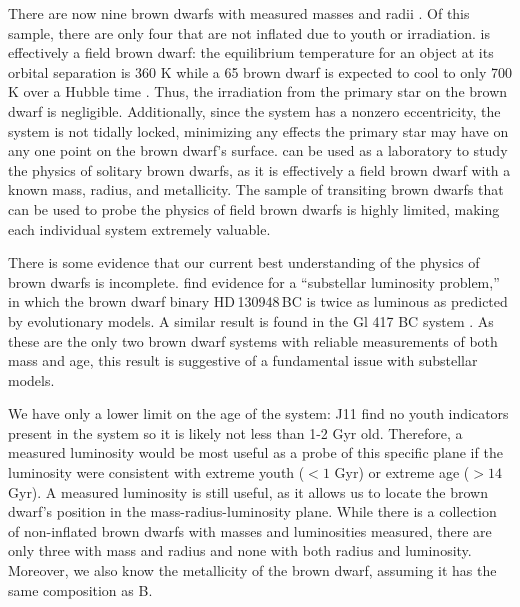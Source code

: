 There are now nine brown dwarfs with measured masses and radii \citep{Moutou13}. 
Of this sample, there are only four that are not inflated due to youth or irradiation.
\LC{} is effectively a field brown dwarf: the equilibrium temperature for an object at its orbital separation is 360 K while a 65 \mjup{} brown dwarf is expected to cool to only 700 K over a Hubble time \citep{Burrows01}.
Thus, the irradiation from the primary star on the brown dwarf is negligible.
Additionally, since the system has a nonzero eccentricity, the system is not tidally locked, minimizing any effects the primary star may have on any one point on the brown dwarf's surface.
\LC{} can be used as a laboratory to study the physics of solitary brown dwarfs, as it is effectively a field brown dwarf with a known mass, radius, and metallicity.
The sample of transiting brown dwarfs that can be used to probe the physics of field brown dwarfs is highly limited, making each individual system extremely valuable.

There is some evidence that our current best understanding of the physics of brown dwarfs is incomplete.
\citet{Dupuy09} find evidence for a ``substellar luminosity problem,'' in which the brown dwarf binary HD\,130948\,BC is twice as luminous as predicted by evolutionary models.
A similar result is found in the Gl 417 BC system \citep{Dupuy14}.
As these are the only two brown dwarf systems with reliable measurements of both mass and age, this result is suggestive of a fundamental issue with substellar models.

We have only a lower limit on the age of the system: J11 find no youth indicators present in the \LHS{} system so it is likely not less than 1-2 Gyr old.
Therefore, a measured luminosity would be most useful as a probe of this specific plane if the luminosity were consistent with extreme youth ($< 1$ Gyr) or extreme age ($>14$ Gyr).
A measured luminosity is still useful, as it allows us to locate the brown dwarf's position in the mass-radius-luminosity plane. 
While there is a collection of non-inflated brown dwarfs with masses and luminosities measured, there are only three with mass and radius and none with both radius and luminosity.
Moreover, we also know the metallicity of the brown dwarf, assuming it has the same composition as \LA B. 

